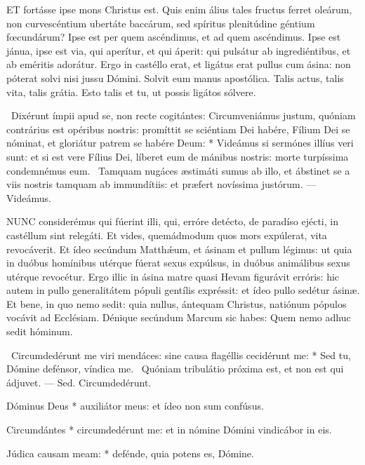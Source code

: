 
\lettrine[lines=2]{E}{T} fortásse ipse mons Christus est. Quis enim álius tales fructus ferret oleárum, non curvescéntium ubertáte baccárum, sed spíritus plenitúdine géntium fœcundárum? Ipse est per quem ascéndimus, et ad quem ascéndimus. Ipse est jánua, ipse est via, qui aperítur, et qui áperit: qui pulsátur ab ingrediéntibus, et ab eméritis adorátur. Ergo in castéllo erat, et ligátus erat pullus cum ásina: non póterat solvi nisi jussu Dómini. Solvit eum manus apostólica. Talis actus, talis vita, talis grátia. Esto talis et tu, ut possis ligátos sólvere.

\R\ Dixérunt ímpii apud se, non recte cogitántes: Circumveniámus justum, quóniam contrárius est opéribus nostris: promíttit se sciéntiam Dei habére, Fílium Dei se nóminat, et gloriátur patrem se habére Deum: * Videámus si sermónes illíus veri sunt: et si est vere Fílius Dei, líberet eum de mánibus nostris: morte turpíssima condemnémus eum. \V\ Tamquam nugáces æstimáti sumus ab illo, et ábstinet se a viis nostris tamquam ab immundítiis: et præfert novíssima justórum. --- Videámus.


\lettrine[lines=2]{N}{UNC} considerémus qui fúerint illi, qui, erróre detécto, de paradíso ejécti, in castéllum sint relegáti. Et vides, quemádmodum quos mors expúlerat, vita revocáverit. Et ídeo secúndum Matthǽum, et ásinam et pullum légimus: ut quia in duóbus homínibus utérque fúerat sexus expúlsus, in duóbus animálibus sexus utérque revocétur. Ergo illic in ásina matre quasi Hevam figurávit erróris: hic autem in pullo generalitátem pópuli gentílis expréssit: et ídeo pullo sedétur ásinæ. Et bene, in quo nemo sedit: quia nullus, ántequam Christus, natiónum pópulos vocávit ad Ecclésiam. Dénique secúndum Marcum sic habes: Quem nemo adhuc sedit hóminum.

\R\ Circumdedérunt me viri mendáces: sine causa flagéllis cecidérunt me: * Sed tu, Dómine defénsor, víndica me. \V\ Quóniam tribulátio próxima est, et non est qui ádjuvet. --- Sed. Circumdedérunt.


 Dóminus Deus * auxiliátor meus: et ídeo non sum confúsus.


 Circumdántes * circumdedérunt me: et in nómine Dómini vindicábor in eis.

 Júdica causam meam: * defénde, quia potens es, Dómine.


